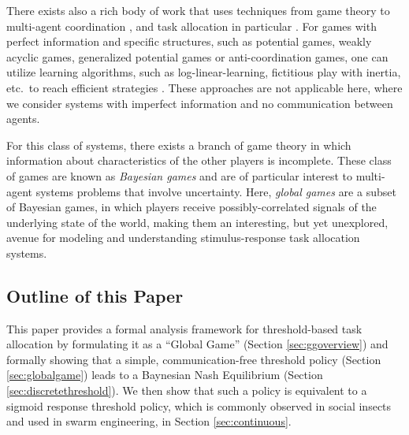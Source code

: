 \documentclass[smallextended]{svjour3}       %
\begin{document}
There exists also a rich body of work that uses techniques from game theory to multi-agent coordination \citep{parsons2002game,nisan2007algorithmic}, and task allocation in particular \citep{shehory1998methods}. For games with perfect information and specific structures, such as potential games, weakly acyclic games, generalized potential games or anti-coordination games, one can utilize learning algorithms, such as log-linear-learning, fictitious play with inertia, etc.\ to reach efficient strategies \citep{tumer2004survey,arslan2007autonomous,marden2009joint,grenager2002dispersion}. These approaches are not applicable here, where we consider systems with imperfect information and no communication between agents. 

For this class of systems, there exists a branch of game theory in which information about characteristics of the other players is incomplete. These class of games are known as \emph{Bayesian games} \citep{harsanyi2004games} and are of particular interest to multi-agent systems problems that involve uncertainty. Here, \emph{global games} \citep{Carlsson1993} are a subset of Bayesian games, in which players receive possibly-correlated signals of the underlying state of the world, making them an interesting, but yet unexplored, avenue for modeling and understanding stimulus-response task allocation systems. 

\subsection{Outline of this Paper}
This paper provides a formal analysis framework for threshold-based task allocation by formulating it as a ``Global Game'' (Section \ref{sec:ggoverview}) and formally showing that a simple, communication-free threshold policy (Section \ref{sec:globalgame}) leads to a Baynesian Nash Equilibrium (Section \ref{sec:discretethreshold}). We then show that such a policy is equivalent to a sigmoid response threshold policy, which is commonly observed in social insects and used in swarm engineering, in Section \ref{sec:continuous}.
\end{document}
